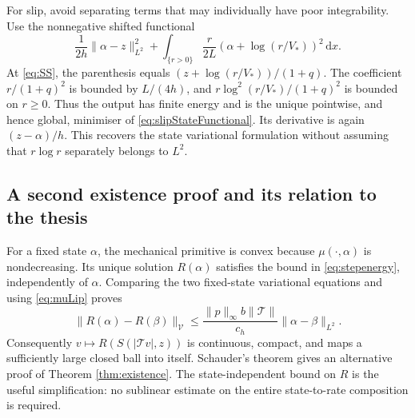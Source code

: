 \documentclass[11pt,a4paper]{article}
\theoremstyle{definition}\newtheorem{definition}[theorem]{Definition}
\theoremstyle{remark}\newtheorem{remark}[theorem]{Remark}
\newcommand{\dd}{\,\mathrm d}
\newcommand{\norm}[1]{\lVert #1\rVert}
\newcommand{\V}{\mathcal V}
\newcommand{\tr}{\mathcal T}
\numberwithin{equation}{section}
\begin{document}
For slip, avoid separating terms that may individually have poor integrability. Use the nonnegative shifted functional
\begin{equation}\label{eq:slipStateFunctional}
 \frac1{2h}\norm{\alpha-z}_{L^2}^2
 +\int_{\{r>0\}}\frac r{2L}
       \left(\alpha+\log(r/V_*)\right)^2\dd x.
\end{equation}
At \eqref{eq:SS}, the parenthesis equals $(z+\log(r/V_*))/(1+q)$. The coefficient $r/(1+q)^2$ is bounded by $L/(4h)$, and $r\log^2(r/V_*)/(1+q)^2$ is bounded on $r\ge0$. Thus the output has finite energy and is the unique pointwise, and hence global, minimiser of \eqref{eq:slipStateFunctional}. Its derivative is again $(z-\alpha)/h$. This recovers the state variational formulation without assuming that $r\log r$ separately belongs to $L^2$.

\subsection{A second existence proof and its relation to the thesis}
For a fixed state $\alpha$, the mechanical primitive is convex because $\mu(\cdot,\alpha)$ is nondecreasing. Its unique solution $R(\alpha)$ satisfies the bound in \eqref{eq:stepenergy}, independently of $\alpha$. Comparing the two fixed-state variational equations and using \eqref{eq:muLip} proves
\[
 \norm{R(\alpha)-R(\beta)}_\V
 \le\frac{\norm p_\infty b\norm\tr}{c_h}\norm{\alpha-\beta}_{L^2}.
\]
Consequently $v\mapsto R(S(|\tr v|,z))$ is continuous, compact, and maps a sufficiently large closed ball into itself. Schauder's theorem gives an alternative proof of Theorem \ref{thm:existence}. The state-independent bound on $R$ is the useful simplification: no sublinear estimate on the entire state-to-rate composition is required.
\end{document}
